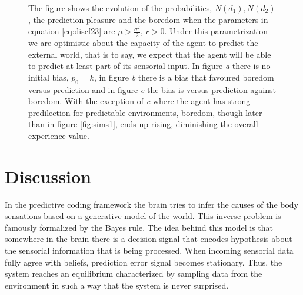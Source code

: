 \documentclass[11pt, onecolumn]{article}
\begin{document}
\begin{figure}[H]
    \subfigure[\label{subfig-1:dummy}]{%
      \texttt{[image: r=02k=s-inv.png]}
    }
    \hfill
    \subfigure[\label{subfig-2:dummy}]{%
      \texttt{[image: r=02k=10s-inv.png]}
    }
    \hfill
    \subfigure[\label{subfig-3:dummy}]{%
      \texttt{[image: r=02s=10k-inv.png]}
    }
    \caption{The figure shows the evolution of the probabilities, $N(d_1), N(d_2)$, the prediction pleasure and the boredom when the parameters in equation \ref{eq:discf23} are $ \mu > \frac{\sigma ^2}{2}$, $r>0$. Under this parametrization we are optimistic about the capacity of the agent to predict the external world, that is to say, we expect that the agent will be able to predict at least part of its sensorial input. In figure \emph{a} there is no initial bias, $p_0 = k$, in figure \emph{b} there is a bias that favoured boredom versus prediction and in figure \emph{c} the bias is versus prediction against boredom. With the exception of \emph{c} where the agent has strong predilection for predictable environments, boredom, though later than in figure \ref{fig:sims1}, ends up rising, diminishing the overall experience value. 
     }
    \label{fig:sims2}
\end{figure}


\section{Discussion}
\label{se:dis}

In the predictive coding framework the brain tries to infer the causes of the body sensations based on a generative model of the world. This inverse problem is famously formalized by the Bayes rule. The idea behind this model is that somewhere in the brain there is a decision signal that encodes hypothesis about the sensorial information that is being processed. When incoming sensorial data fully agree with beliefs, prediction error signal becomes stationary. Thus, the system reaches an equilibrium characterized by sampling data from the environment in such a way that the system is never surprised.   
\end{document}
